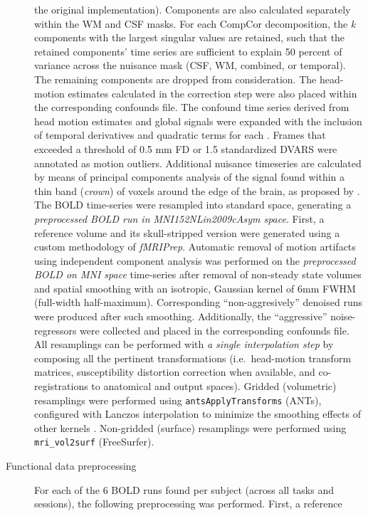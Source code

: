 \documentclass[
]{article}
\begin{document}
\begin{description}
the original implementation). Components are also calculated separately
within the WM and CSF masks. For each CompCor decomposition, the
\emph{k} components with the largest singular values are retained, such
that the retained components' time series are sufficient to explain 50
percent of variance across the nuisance mask (CSF, WM, combined, or
temporal). The remaining components are dropped from consideration. The
head-motion estimates calculated in the correction step were also placed
within the corresponding confounds file. The confound time series
derived from head motion estimates and global signals were expanded with
the inclusion of temporal derivatives and quadratic terms for each
\citep{confounds_satterthwaite_2013}. Frames that exceeded a threshold
of 0.5 mm FD or 1.5 standardized DVARS were annotated as motion
outliers. Additional nuisance timeseries are calculated by means of
principal components analysis of the signal found within a thin band
(\emph{crown}) of voxels around the edge of the brain, as proposed by
\citep{patriat_improved_2017}. The BOLD time-series were resampled into
standard space, generating a \emph{preprocessed BOLD run in
MNI152NLin2009cAsym space}. First, a reference volume and its
skull-stripped version were generated using a custom methodology of
\emph{fMRIPrep}. Automatic removal of motion artifacts using independent
component analysis \citep[ICA-AROMA,][]{aroma} was performed on the
\emph{preprocessed BOLD on MNI space} time-series after removal of
non-steady state volumes and spatial smoothing with an isotropic,
Gaussian kernel of 6mm FWHM (full-width half-maximum). Corresponding
``non-aggresively'' denoised runs were produced after such smoothing.
Additionally, the ``aggressive'' noise-regressors were collected and
placed in the corresponding confounds file. All resamplings can be
performed with \emph{a single interpolation step} by composing all the
pertinent transformations (i.e.~head-motion transform matrices,
susceptibility distortion correction when available, and
co-registrations to anatomical and output spaces). Gridded (volumetric)
resamplings were performed using \texttt{antsApplyTransforms} (ANTs),
configured with Lanczos interpolation to minimize the smoothing effects
of other kernels \citep{lanczos}. Non-gridded (surface) resamplings were
performed using \texttt{mri\_vol2surf} (FreeSurfer).
\item[Functional data preprocessing]
For each of the 6 BOLD runs found per subject (across all tasks and
sessions), the following preprocessing was performed. First, a reference

\end{description}
\end{document}
